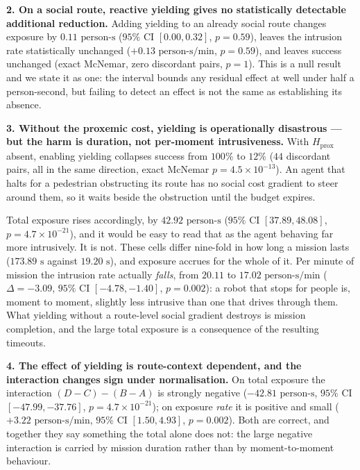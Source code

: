 \documentclass[journal]{IEEEtran}
\begin{document}
\textbf{2. On a social route, reactive yielding gives no statistically detectable additional reduction.} Adding yielding to an already social route changes exposure by $0.11\text{ person-s}$ ($95\%$ CI $[0.00, 0.32]$, $p = 0.59$), leaves the intrusion rate statistically unchanged ($+0.13\text{ person-s/min}$, $p = 0.59$), and leaves success unchanged (exact McNemar, zero discordant pairs, $p = 1$). This is a null result and we state it as one: the interval bounds any residual effect at well under half a person-second, but failing to detect an effect is not the same as establishing its absence.

\textbf{3. Without the proxemic cost, yielding is operationally disastrous --- but the harm is duration, not per-moment intrusiveness.} With $H_{\text{prox}}$ absent, enabling yielding collapses success from $100\%$ to $12\%$ ($44$ discordant pairs, all in the same direction, exact McNemar $p = 4.5 \times 10^{-13}$). An agent that halts for a pedestrian obstructing its route has no social cost gradient to steer around them, so it waits beside the obstruction until the budget expires.

Total exposure rises accordingly, by $42.92\text{ person-s}$ ($95\%$ CI $[37.89, 48.08]$, $p = 4.7 \times 10^{-21}$), and it would be easy to read that as the agent behaving far more intrusively. It is not. These cells differ nine-fold in how long a mission lasts ($173.89\text{ s}$ against $19.20\text{ s}$), and exposure accrues for the whole of it. Per minute of mission the intrusion rate actually \emph{falls}, from $20.11$ to $17.02\text{ person-s/min}$ ($\Delta = -3.09$, $95\%$ CI $[-4.78, -1.40]$, $p = 0.002$): a robot that stops for people is, moment to moment, slightly less intrusive than one that drives through them. What yielding without a route-level social gradient destroys is mission completion, and the large total exposure is a consequence of the resulting timeouts.

\textbf{4. The effect of yielding is route-context dependent, and the interaction changes sign under normalisation.} On total exposure the interaction $(D - C) - (B - A)$ is strongly negative ($-42.81\text{ person-s}$, $95\%$ CI $[-47.99, -37.76]$, $p = 4.7 \times 10^{-21}$); on exposure \emph{rate} it is positive and small ($+3.22\text{ person-s/min}$, $95\%$ CI $[1.50, 4.93]$, $p = 0.002$). Both are correct, and together they say something the total alone does not: the large negative interaction is carried by mission duration rather than by moment-to-moment behaviour.
\end{document}
